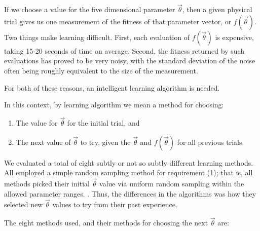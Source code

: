 If we choose a value for the five dimensional parameter
$\vec{\theta}$, then a given physical trial gives us one measurement
of the fitness of that parameter vector, or $f(\vec{\theta})$.  Two
things make learning difficult.  First, each evaluation of
$f(\vec{\theta})$ is expensive, taking 15-20 seconds of time on
average.  Second, the fitness returned by such evaluations has proved
to be very noisy, with the standard deviation of the noise often being
roughly equivalent to the size of the measurement.

For both of these reasons, an intelligent learning algorithm is
needed.

In this context, by learning algorithm we mean a method for choosing:

\begin{enumerate}
\item The value for $\vec{\theta}$ for the initial trial, and
\item The next value of $\vec{\theta}$ to try, given the
  $\vec{\theta}$ and $f(\vec{\theta})$ for all previous trials.
\end{enumerate}

We evaluated a total of eight subtly or not so subtly different
learning methods.  All employed a simple random sampling method for
requirement (1); that is, all methods picked their initial
$\vec{\theta}$ value via uniform random sampling within the allowed
parameter ranges. .  Thus, the
differences in the algorithms was how they selected new $\vec{\theta}$
values to try from their past experience.

The eight methods used, and their methods for choosing the next
$\vec{\theta}$ are:







